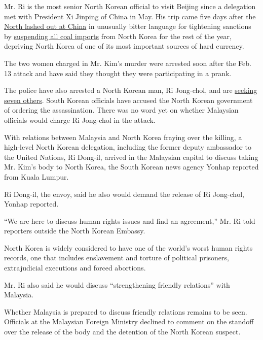 Mr. Ri is the most senior North Korean official to visit Beijing since a
delegation met with President Xi Jinping of China in May. His trip came
five days after the
\href{https://www.nytimes3xbfgragh.onion/2017/02/23/world/asia/north-korea-china.html}{North
lashed out at China} in unusually bitter language for tightening
sanctions by
\href{https://www.nytimes3xbfgragh.onion/2017/02/18/world/asia/north-korea-china-coal-imports-suspended.html}{suspending
all coal imports} from North Korea for the rest of the year, depriving
North Korea of one of its most important sources of hard currency.

The two women charged in Mr. Kim's murder were arrested soon after the
Feb. 13 attack and have said they thought they were participating in a
prank.

The police have also arrested a North Korean man, Ri Jong-chol, and are
\href{https://www.nytimes3xbfgragh.onion/2017/02/27/world/asia/north-korea-kim-jong-nam-state-security.html?rref=collection\%2Fsectioncollection\%2Fasia\&action=click\&contentCollection=asia\&region=stream\&module=stream_unit\&version=latest\&contentPlacement=7\&pgtype=sectionfront}{seeking
seven others}. South Korean officials have accused the North Korean
government of ordering the assassination. There was no word yet on
whether Malaysian officials would charge Ri Jong-chol in the attack.

With relations between Malaysia and North Korea fraying over the
killing, a high-level North Korean delegation, including the former
deputy ambassador to the United Nations, Ri Dong-il, arrived in the
Malaysian capital to discuss taking Mr. Kim's body to North Korea, the
South Korean news agency Yonhap reported from Kuala Lumpur.

Ri Dong-il, the envoy, said he also would demand the release of Ri
Jong-chol, Yonhap reported.

``We are here to discuss human rights issues and find an agreement,''
Mr. Ri told reporters outside the North Korean Embassy.

North Korea is widely considered to have one of the world's worst human
rights records, one that includes enslavement and torture of political
prisoners, extrajudicial executions and forced abortions.

Mr. Ri also said he would discuss ``strengthening friendly relations''
with Malaysia.

Whether Malaysia is prepared to discuss friendly relations remains to be
seen. Officials at the Malaysian Foreign Ministry declined to comment on
the standoff over the release of the body and the detention of the North
Korean suspect.

